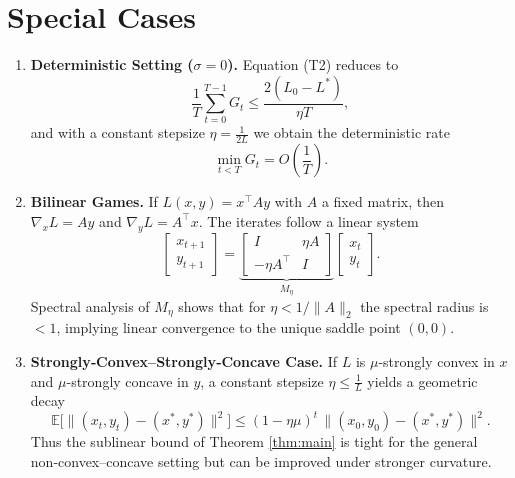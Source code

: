 \documentclass{article}
\newcommand{\E}{\mathbb{E}}
\begin{document}
\section*{Special Cases}
\begin{enumerate}
\item \textbf{Deterministic Setting (\(\sigma=0\)).}  
Equation (T2) reduces to
\[
\frac{1}{T}\sum_{t=0}^{T-1} G_{t}
\le \frac{2(L_{0}-L^{*})}{\eta T},
\]
and with a constant stepsize \(\eta=\frac{1}{2L}\) we obtain the deterministic rate
\[
\min_{t<T} G_{t}=O\!\left(\frac{1}{T}\right).
\]

\item \textbf{Bilinear Games.}  
If \(L(x,y)=x^{\top}Ay\) with \(A\) a fixed matrix, then \(\nabla_{x}L=Ay\) and \(\nabla_{y}L=A^{\top}x\). The iterates follow a linear system
\[
\begin{bmatrix}x_{t+1}\\ y_{t+1}\end{bmatrix}
=
\underbrace{\begin{bmatrix}
I & \eta A\\
-\eta A^{\top} & I
\end{bmatrix}}_{\displaystyle M_{\eta}}
\begin{bmatrix}x_{t}\\ y_{t}\end{bmatrix}.
\]
Spectral analysis of \(M_{\eta}\) shows that for \(\eta<1/\|A\|_{2}\) the spectral radius is \(<1\), implying linear convergence to the unique saddle point \((0,0)\).

\item \textbf{Strongly‑Convex–Strongly‑Concave Case.}  
If \(L\) is \(\mu\)-strongly convex in \(x\) and \(\mu\)-strongly concave in \(y\), a constant stepsize \(\eta\le \frac{1}{L}\) yields a geometric decay
\[
\E\!\big[\|(x_{t},y_{t})-(x^{*},y^{*})\|^{2}\big]
\le (1-\eta\mu)^{t}\,\|(x_{0},y_{0})-(x^{*},y^{*})\|^{2}.
\]
Thus the sublinear bound of Theorem \ref{thm:main} is tight for the general non‑convex–concave setting but can be improved under stronger curvature.
\end{enumerate}
\end{document}
